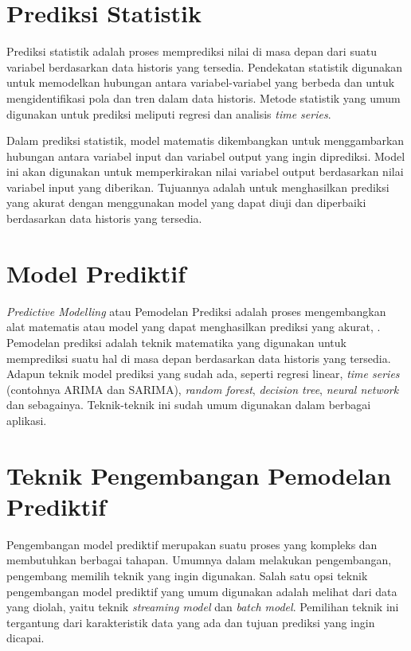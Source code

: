 \section{Prediksi Statistik}
Prediksi statistik adalah proses memprediksi nilai di masa depan dari suatu variabel berdasarkan data historis yang tersedia. Pendekatan statistik digunakan untuk memodelkan hubungan antara variabel-variabel yang berbeda dan untuk mengidentifikasi pola dan tren dalam data historis. Metode statistik yang umum digunakan untuk prediksi meliputi regresi dan analisis \textit{time series}.

Dalam prediksi statistik, model matematis dikembangkan untuk menggambarkan hubungan antara variabel input dan variabel output yang ingin diprediksi. Model ini akan digunakan untuk memperkirakan nilai variabel output berdasarkan nilai variabel input yang diberikan. Tujuannya adalah untuk menghasilkan prediksi yang akurat dengan menggunakan model yang dapat diuji dan diperbaiki berdasarkan data historis yang tersedia.

\section{Model Prediktif}
\textit{Predictive Modelling} atau Pemodelan Prediksi adalah proses mengembangkan alat matematis atau model yang dapat menghasilkan prediksi yang akurat, \parencite{appliedpredictivemodel}. Pemodelan prediksi adalah teknik matematika yang digunakan untuk memprediksi suatu hal di masa depan berdasarkan data historis yang tersedia. 
Adapun teknik model prediksi yang sudah ada, seperti regresi linear, \textit{time series} (contohnya ARIMA dan SARIMA), \textit{random forest}, \textit{decision tree}, \textit{neural network} dan sebagainya. Teknik-teknik ini sudah umum digunakan dalam berbagai aplikasi.

\section{Teknik Pengembangan Pemodelan Prediktif}

Pengembangan model prediktif merupakan suatu proses yang kompleks dan membutuhkan berbagai tahapan. Umumnya dalam melakukan pengembangan, pengembang memilih teknik yang ingin digunakan. Salah satu opsi teknik pengembangan model prediktif yang umum digunakan adalah melihat dari data yang diolah, yaitu teknik \textit{streaming model} dan \textit{batch model}. Pemilihan teknik ini tergantung dari karakteristik data yang ada dan tujuan prediksi yang ingin dicapai.

